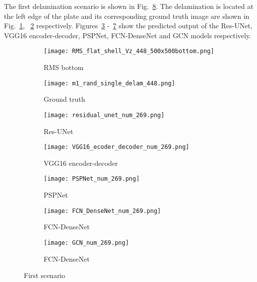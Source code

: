 The first delamination scenario is shown in Fig.~\ref{fig:softmax_448}. 
The delamination is located at the left edge of the plate and its corresponding ground truth image are shown in Fig.~\ref{fig:RMS_flat_shell_Vz_448}, ~\ref{fig:m1_rand_single_delam_448} respectively. 
Figures~\ref{fig:unet_pred_448} -~\ref{fig:gcn_pred_448} show the predicted output of the Res-UNet, VGG16 encoder-decoder, PSPNet, FCN-DenseNet and GCN models respectively. 
\begin{figure} [!h]
	\centering
	\begin{subfigure}[b]{0.47\textwidth}
		\centering
		\texttt{[image: RMS\_flat\_shell\_Vz\_448\_500x500bottom.png]}
		\caption{RMS bottom}
		\label{fig:RMS_flat_shell_Vz_448}
	\end{subfigure}
	\hfill
	\begin{subfigure}[b]{0.47\textwidth}
		\centering
		\texttt{[image: m1\_rand\_single\_delam\_448.png]}
		\caption{Ground truth}
		\label{fig:m1_rand_single_delam_448}
	\end{subfigure}
	\begin{subfigure}[b]{0.47\textwidth}
		\centering
		\texttt{[image: residual\_unet\_num\_269.png]}
		\caption{Res-UNet}
		\label{fig:unet_pred_448}
	\end{subfigure}
	\hfill
	\begin{subfigure}[b]{0.47\textwidth}
		\centering
		\texttt{[image: VGG16\_ecoder\_decoder\_num\_269.png]}
		\caption{VGG16 encoder-decoder}
		\label{fig:vgg16_pred_448}
	\end{subfigure}
	\hfill
	\begin{subfigure}[b]{0.47\textwidth}
		\centering
		\texttt{[image: PSPNet\_num\_269.png]}
		\caption{PSPNet}
		\label{fig:pspnet_pred_448}
	\end{subfigure}
	\hfill
	\begin{subfigure}[b]{0.47\textwidth}
		\centering
		\texttt{[image: FCN\_DenseNet\_num\_269.png]}
		\caption{FCN-DenseNet}
		\label{fig:fcn_densenet_pred_448}
	\end{subfigure}
	\hfill
	\begin{subfigure}[b]{0.47\textwidth}
		\centering
		\texttt{[image: GCN\_num\_269.png]}
		\caption{FCN-DenseNet}
		\label{fig:gcn_pred_448}
	\end{subfigure}
	
	\caption{First scenario}
	\label{fig:softmax_448}
\end{figure} 
